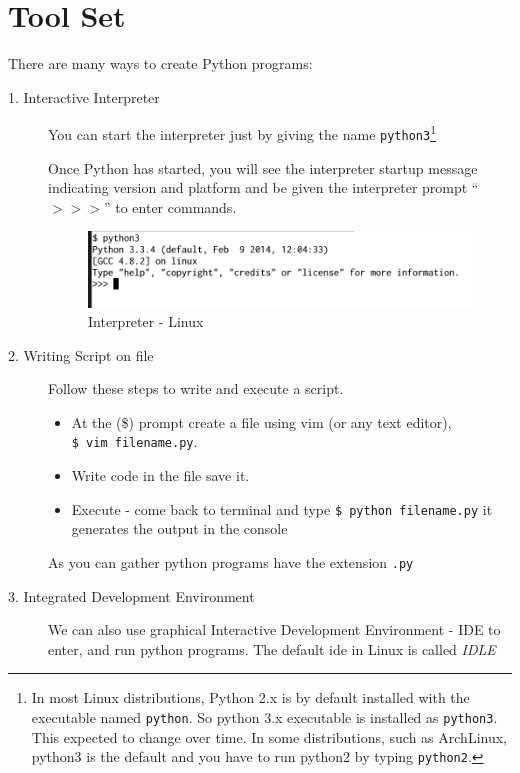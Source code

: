 \documentclass[11pt,a4paper]{article}
\begin{document}
\section*{Tool Set}
There are many ways to create Python programs:
\begin{description}
    \item[1. Interactive Interpreter] You can start the interpreter just by giving the name \texttt{python3}\footnote{In most Linux distributions, Python 2.x is by default installed with the executable named \texttt{python}. So python 3.x executable is installed as \texttt{python3}. This expected to change over time. In some distributions, such as ArchLinux, python3 is the default and you have to run python2 by typing \texttt{python2}.}

Once Python has started, you will see the interpreter startup message indicating version and platform and be given the interpreter prompt ``$>>>$'' to enter commands.

\begin{figure}[ht]
\begin{center}
\includegraphics[scale=0.5]{01-Interpreter.png}
\caption{Interpreter - Linux}
\label{Interpreter}
\end{center}
\end{figure}

\item[2. Writing Script on file] Follow these steps to write and execute a script.
\begin{itemize}
    \item At the (\$) prompt create a file using vim (or any text editor),\\\texttt{\$ vim filename.py}.
    \item Write code in the file save it.
\item Execute - come back to terminal and type \texttt{\$ python filename.py} it generates the output in the console
\end{itemize}
As you can gather python programs have the extension \texttt{.py}

\item[3. Integrated Development Environment] We can also use graphical Interactive Development Environment - IDE to enter, and run python programs. The default ide in Linux is called \emph{IDLE}


\end{description}
\end{document}
